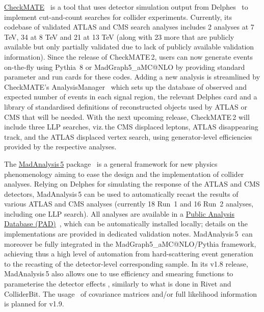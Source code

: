 \documentclass[a4paper,aps,prd,longbibliography,notitlepage,showpacs,amsmath,amssymb,superscriptaddress,nofootinbib,floatfix,11pt,preprintnumbers]{revtex4-1-mod}
\newcommand{\checkmate}{\textsf{CheckMATE}\xspace}
\newcommand{\madanalysis}{\textsf{MadAnalysis\,5}\xspace}
\newcommand{\delphes}{\textsf{Delphes}\xspace}
\newcommand{\pythia}{\textsf{Pythia}\xspace}
\begin{document}
\href{https://checkmate.hepforge.org/}{\checkmate}~\cite{Drees:2013wra,Dercks:2016npn} is a tool that uses detector simulation output from \delphes~\cite{deFavereau:2013fsa} to implement cut-and-count searches for collider experiments.  Currently, its codebase of validated ATLAS and CMS search analyses includes 2 analyses at 7 TeV, 34 at 8 TeV and 21 at 13 TeV (along with 23 more that are publicly available but only partially validated due to lack of publicly available validation information).  Since the release of \checkmate\,2, users can now generate events on-the-fly using \pythia~8 or \textsf{MadGraph5\_aMC@NLO} by providing standard parameter and run cards for these codes.  Adding a new analysis is streamlined by \checkmate's AnalysisManager~\cite{Kim:2015wza} which sets up the database of observed and expected number of events in each signal region, the relevant \delphes card and a library of standardised definitions of reconstructed objects used by ATLAS or CMS that will be needed.  With the next upcoming release, \checkmate\,2 will include three LLP searches, viz.\,the CMS displaced leptons, ATLAS disappearing track, and the ATLAS displaced vertex search, using  generator-level efficiencies provided by the respective analyses.

The \href{http://madanalysis.irmp.ucl.ac.be/}{\madanalysis} package~\cite{Conte:2012fm,Conte:2014zja} is a general framework for new physics phenomenology aiming to ease the design and the implementation of collider analyses. Relying on \delphes for
simulating the response of the ATLAS and CMS detectors, \madanalysis can be used
to automatically recast the results of various ATLAS and CMS analyses (currently 18 Run~1 and 16 Run~2 analyses, including one LLP search).
All analyses are available in a \href{https://madanalysis.irmp.ucl.ac.be/wiki/PublicAnalysisDatabase}{Public Analysis Database (PAD)}~\cite{Dumont:2014tja,Conte:2018vmg}, which
can be automatically installed locally; details
on the implementations are provided in dedicated validation notes.
\madanalysis\ can moreover be fully integrated in the \textsf{MadGraph5\_aMC@NLO}/\pythia framework, achieving thus a high level of automation from hard-scattering event generation to the recasting of the detector-level corresponding sample.
In its v1.8 release, \madanalysis also allows one to use efficiency and smearing functions to parameterise the detector effects \cite{Araz:2020lnp}, similarly to what is done in Rivet and ColliderBit. The usage~\cite{Brooijmans:2020yij} of covariance matrices and/or full likelihood information is planned for v1.9.
\end{document}
